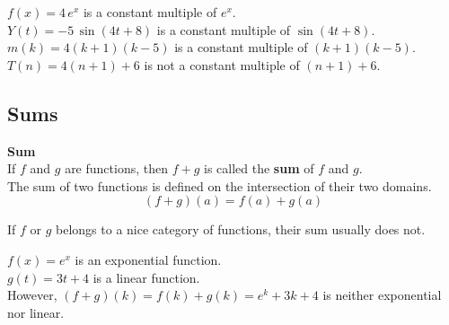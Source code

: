 \documentclass{ximera}
\begin{document}
\begin{example}

$f(x) = 4 \, e^x$ is a constant multiple of $e^x$. \\
$Y(t) = -5 \, \sin(4t + 8)$ is a constant multiple of $\sin(4t + 8)$. \\
$m(k) = 4 (k+1)(k-5)$ is a constant multiple of $(k+1)(k-5)$. \\


$T(n) = 4 (n+1) + 6$ is not a constant multiple of $(n+1) + 6$. \\

\end{example}


















\subsection*{Sums}


\begin{template}  \textbf{\textcolor{blue!55!black}{Sum}} \\


If  $f$ and $g$ are functions, then $f + g$ is called the \textbf{\textcolor{green!50!black}{sum}} of $f$ and $g$. \\

The sum of two functions is defined on the intersection of their two domains. \\


\[ (f + g)(a) = f(a) + g(a)  \]



\end{template}



\begin{warning}

If $f$ or $g$ belongs to a nice category of functions, their sum usually does not.

\end{warning}




\begin{example}

$f(x) = e^x$ is an exponential function. \\
$g(t) = 3 t + 4$ is a linear function. \\

However, $(f + g)(k) = f(k) + g(k) = e^k + 3 k + 4$ is neither exponential nor linear.

\end{example}
\end{document}
